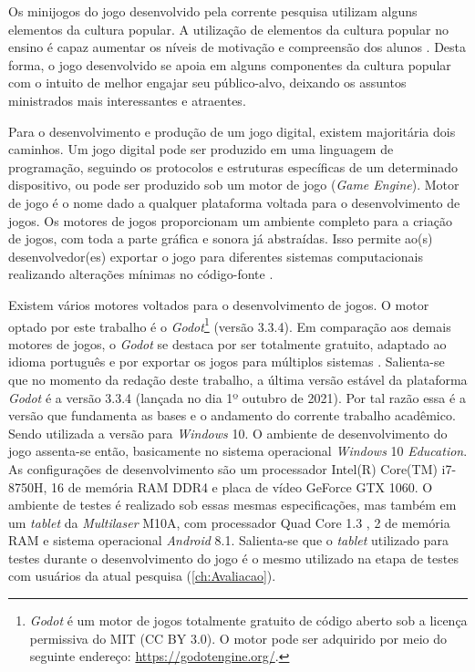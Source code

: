 Os minijogos do jogo desenvolvido pela corrente pesquisa utilizam alguns elementos da cultura popular. A utilização de elementos da cultura popular no ensino é capaz aumentar os níveis de motivação e compreensão dos alunos \cite{giroux1988schooling, cheung2001use, duncan2004your, chik2011learner}. Desta forma, o jogo desenvolvido se apoia em alguns componentes da cultura popular com o intuito de melhor engajar seu público-alvo, deixando os assuntos ministrados mais interessantes e atraentes. 

Para o desenvolvimento e produção de um jogo digital, existem majoritária dois caminhos. Um jogo digital pode ser produzido em uma linguagem de programação, seguindo os protocolos e estruturas específicas de um determinado dispositivo, ou pode ser produzido sob um motor de jogo (\textit{Game Engine}). Motor de jogo é o nome dado a qualquer plataforma voltada para o desenvolvimento de jogos. Os motores de jogos proporcionam um ambiente completo para a criação de jogos, com toda a parte gráfica e sonora já abstraídas. Isso permite ao(s) desenvolvedor(es) exportar o jogo para diferentes sistemas computacionais realizando alterações mínimas no código-fonte \cite{bishop1998designing, machado2009serious}.

Existem vários motores voltados para o desenvolvimento de jogos. O motor optado por este trabalho é o \textit{Godot}\footnote{\textit{Godot} é um motor de jogos totalmente gratuito de código aberto sob a licença permissiva do MIT (CC BY 3.0). O motor pode ser adquirido por meio do seguinte endereço: \url{https://godotengine.org/}.} (versão 3.3.4). Em comparação aos demais motores de jogos, o \textit{Godot} se destaca por ser totalmente gratuito, adaptado ao idioma português e por exportar os jogos para múltiplos sistemas \cite{scherer2020analise}. Salienta-se que no momento da redação deste trabalho, a última versão estável da plataforma \textit{Godot} é a versão 3.3.4 (lançada no dia 1º outubro de 2021). Por tal razão essa é a versão que fundamenta as bases e o andamento do corrente trabalho acadêmico. Sendo utilizada a versão para \textit{Windows} 10. O ambiente de desenvolvimento do jogo assenta-se então, basicamente no sistema operacional \textit{Windows} 10 \textit{Education}. As configurações de desenvolvimento são um processador Intel(R) Core(TM) i7-8750H, 16  de memória RAM DDR4 e placa de vídeo GeForce GTX 1060. O ambiente de testes é realizado sob essas mesmas especificações, mas também em um \textit{tablet} da \textit{Multilaser} M10A, com processador Quad Core 1.3 , 2  de memória RAM e sistema operacional \textit{Android} 8.1. Salienta-se que o \textit{tablet} utilizado para testes durante o desenvolvimento do jogo é o mesmo utilizado na etapa de testes com usuários da atual pesquisa (\autoref{ch:Avaliacao}).

